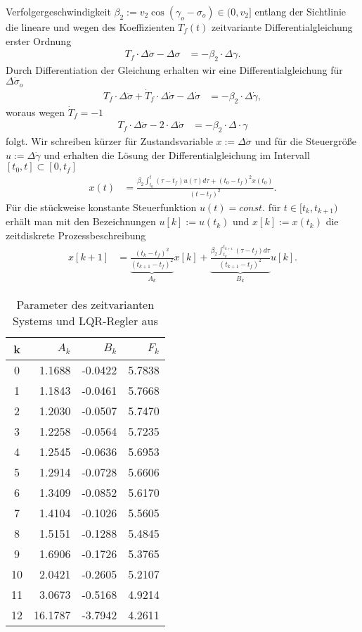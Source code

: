 Verfolgergeschwindigkeit $\beta_2 := v_2\cos(\gamma_o - \sigma_o)\in(0,v_2]$ entlang der Sichtlinie die lineare und wegen des Koeffizienten $T_f(t)$ zeitvariante Differentialgleichung
erster Ordnung
\begin{align}
	T_f\cdot\Delta\dot{\sigma}-\Delta\sigma & = -\beta_2\cdot\Delta\gamma .
\end{align}
Durch Differentiation der Gleichung erhalten wir eine Differentialgleichung für $\Delta\dot{\sigma}_o$
\begin{align}
	T_f\cdot\Delta\ddot{\sigma} + \dot{T}_f\cdot\Delta\dot{\sigma}-\Delta\dot{\sigma} & = -\beta_2\cdot\Delta\dot{\gamma},
\end{align}
woraus wegen $\dot{T}_f=-1$
\begin{align}
	T_f\cdot\Delta\ddot{\sigma}-2\cdot\Delta\dot{\sigma} & = -\beta_2\cdot\Delta\cdot{\gamma}
\end{align}
folgt. Wir schreiben kürzer für Zustandsvariable $x:=\Delta\dot{\sigma}$ und für die Steuergröße $u:=\Delta\dot{\gamma}$ und erhalten die Lösung der Differentialgleichung im Intervall
$[t_0,t]\subset[0,t_f]$
\begin{align}
	x(t) & = \frac{\beta_2\int_{t_0}^t(\tau - t_f)u(\tau)d\tau + (t_0-t_f)^2x(t_0) }{(t-t_f)^2}.
\end{align}
Für die stückweise konstante Steuerfunktion $u(t)=const.$ für $t\in[t_k,t_{k+1})$ erhält man mit den Bezeichnungen $u[k]:=u(t_k)$ und $x[k]:=x(t_k)$ die zeitdiskrete Prozessbeschreibung
\begin{align}\label{eqn:kap_3_bsp_rf_ressys}
	x[k+1] & = \underbrace{\frac{(t_k-t_f)^2}{(t_{k+1}-t_f)^2} }_{A_k}x[k] + \underbrace{\frac{\beta_2\int_{t_k}^{t_{k+1}}(\tau - t_f)d\tau }{(t_{k+1}-t_f)^2} }_{B_k}u[k].
\end{align}
\begin{table}[htb]
\caption{Parameter des zeitvarianten Systems und \ac{LQR}-Regler aus }
\centering
\begin{tabular}{|c|r|r|r|}
	\hline
	k 	& $A_k$		& $B_k$		& $F_k$	\\\hline
	0	& 1.1688	& -0.0422	& 5.7838\\
	1	& 1.1843	& -0.0461	& 5.7668\\
	2	& 1.2030	& -0.0507	& 5.7470\\
	3	& 1.2258	& -0.0564	& 5.7235\\
	4	& 1.2545	& -0.0636	& 5.6953\\
	5	& 1.2914	& -0.0728	& 5.6606\\
	6	& 1.3409	& -0.0852	& 5.6170\\
	7	& 1.4104	& -0.1026	& 5.5605\\
	8	& 1.5151	& -0.1288	& 5.4845\\
	9	& 1.6906	& -0.1726	& 5.3765\\
	10	& 2.0421	& -0.2605	& 5.2107\\
	11	& 3.0673	& -0.5168	& 4.9214\\
	12	& 16.1787	& -3.7942	& 4.2611\\\hline
\end{tabular}
\label{tab:kap_3_bsp_rf_parameter}
\end{table}
